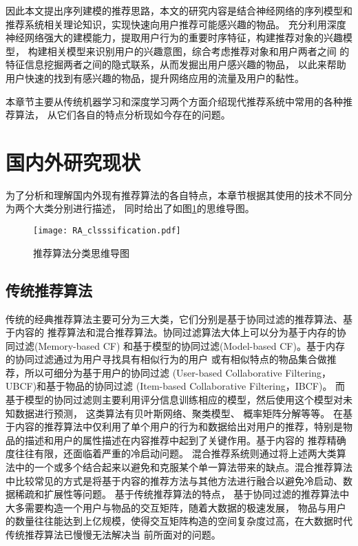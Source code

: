 因此本文提出序列建模的推荐思路，本文的研究内容是结合神经网络的序列模型和推荐系统相关理论知识，实现快速向用户推荐可能感兴趣的物品。%
充分利用深度神经网络强大的建模能力，提取用户行为的重要时序特征，构建推荐对象的兴趣模型，%
构建相关模型来识别用户的兴趣意图，综合考虑推荐对象和用户两者之间%
的特征信息挖掘两者之间的隐式联系，从而发掘出用户感兴趣的物品，
以此来帮助用户快速的找到有感兴趣的物品，提升网络应用的流量及用户的黏性。%






%
本章节主要从传统机器学习和深度学习两个方面介绍现代推荐系统中常用的各种推荐算法，%
从它们各自的特点分析现如今存在的问题。

\section{国内外研究现状}

为了分析和理解国内外现有推荐算法的各自特点，本章节根据其使用的技术不同分为两个大类分别进行描述，
同时给出了如图\ref{fig:RA_clsssification}的思维导图。

\begin{figure}[htb]
  \centering
  \texttt{[image: RA\_clsssification.pdf]}\\
  \caption{推荐算法分类思维导图}
  \label{fig:RA_clsssification}
\end{figure}

\subsection{传统推荐算法}

传统的经典推荐算法主要可分为三大类，它们分别是基于协同过滤的推荐算法、基于内容的%
推荐算法和混合推荐算法。协同过滤算法大体上可以分为基于内存的协同过滤(Memory-based CF)%
和基于模型的协同过滤(Model-based CF)。基于内存的协同过滤通过为用户寻找具有相似行为的用户%
或有相似特点的物品集合做推荐，所以可细分为基于用户的协同过滤%
(User-based Collaborative Filtering，UBCF)和基于物品的协同过滤%
(Item-based Collaborative Filtering，IBCF)。
而基于模型的协同过滤则主要利用评分信息训练相应的模型，然后使用这个模型对未知数据进行预测，%
这类算法有贝叶斯网络、聚类模型、%
概率矩阵分解等等。
在基于内容的推荐算法中仅利用了单个用户的行为和数据给出对用户的推荐，特别是物品的描述和用户的属性描述在内容推荐中起到了关键作用。基于内容的
推荐精确度往往有限，还面临着严重的冷启动问题。
混合推荐系统则通过将上述两大类算法中的一个或多个结合起来以避免和克服某个单一算法带来的缺点。混合推荐算法中比较常见的方式是将基于内容的推荐方法与其他方法进行融合以避免冷启动、数据稀疏和扩展性等问题。
基于传统推荐算法的特点，%
基于协同过滤的推荐算法中大多需要构造一个用户与物品的交互矩阵，随着大数据的极速发展，%
物品与用户的数量往往能达到上亿规模，使得交互矩阵构造的空间复杂度过高，在大数据时代传统推荐算法已慢慢无法解决当%
前所面对的问题。

